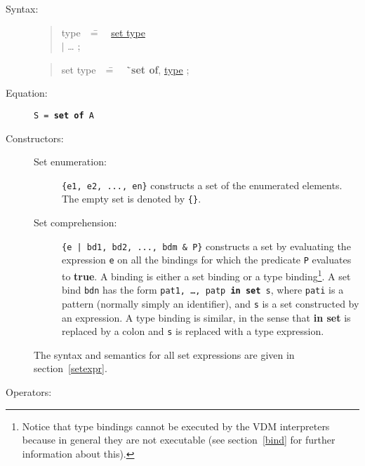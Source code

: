 \documentclass{overturerepchap}
\newcommand{\Rule}[2]{
  \begin{quote}\begin{tabbing}
    #1\index{#1}\ \ \= = \ \ \= #2  ; %
    
  \end{tabbing}\end{quote}
  }
\newcommand{\Ruleref}[1]{
  \hyperlink{rule:#1}{#1}}
\newcommand{\dsep}{\\ \> $|$ \>}
\newcommand{\Lop}[1]{`{\bf\ttfamily #1}\Quote}
\newcommand{\keyw}[1]{{\bf\ttfamily #1}}
\begin{document}
\begin{description}
\item[Syntax:] 
  \Rule{type}{
   \Ruleref{set type} \dsep
    \ldots
    }
  
  \Rule{set type}{\Lop{set of}, \Ruleref{type}}

\item[Equation:] {\tt S = \keyw{set of} A}\index{\keyw{set of}}

\item[Constructors:] \mbox{}

  \begin{description}
  \item[Set enumeration:] \verb|{e1, e2, ..., en}| constructs a set of the
    enumerated elements. The empty set is denoted by {\tt \{\}}.
  
  \item[Set comprehension:] \verb+{e | bd1, bd2, ..., bdm & P}+
    constructs a set by evaluating the expression {\tt e} on all the
    bindings for which the predicate {\tt P} evaluates to \keyw{true}.
    A binding is either a set binding or a type
    binding\footnote{Notice that type bindings cannot be executed by
      the VDM interpreters because in general
      they are not executable (see section~\ref{bind} for further
      information about this).}.  A set bind {\tt bdn} has the form
    {\tt pat1, \ldots, patp \keyw{in set} s}, where {\tt pati} is a
    pattern (normally simply an identifier), and {\tt s} is a set
    constructed by an expression. A type binding is similar, in the
    sense that \keyw{in set} is replaced by a colon and {\tt s} is
    replaced with a type expression.
  \end{description}
  The syntax and semantics for all set expressions are given in
  section~\ref{setexpr}.%
\item[Operators:] \mbox{}


\end{description}
\end{document}
